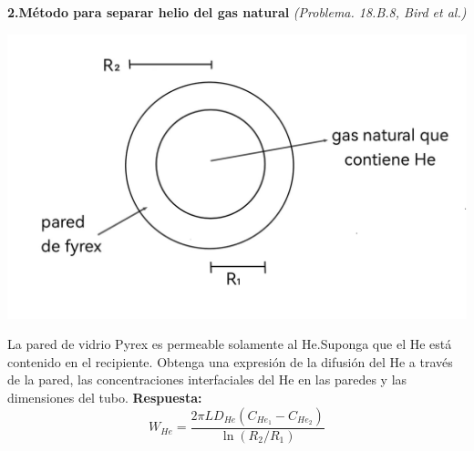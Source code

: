 \textbf{2.Método para separar helio del gas natural} \textit{(Problema. 18.B.8, Bird et al.)}
\flushleft
\vspace{0.4cm}
\begin{minipage}{0.4\textwidth} %
    \includegraphics[width=\linewidth]{./Capitulo2/Imagenes/imagen-2.jpg} %
\end{minipage}
\hfill %
\begin{minipage}{0.55\textwidth} %
La pared de vidrio Pyrex es permeable solamente al He.Suponga que el He está contenido en el recipiente. Obtenga una expresión de la difusión del He a través de la pared, las concentraciones interfaciales del He en las paredes y las dimensiones del tubo.
\vspace{0.5cm} %
\flushleft
\textbf{Respuesta:
\[
W_{He} = \frac{2\pi L D_{He} (C_{He_{1}} - C_{He_{2}})}{\ln (R_2/R_1)}
\]}
\end{minipage}
\vspace{0.5cm}

